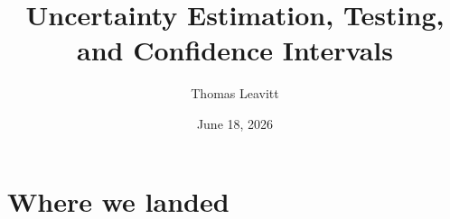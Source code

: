 \documentclass[table, xcolor = {dvipsnames}, 9pt]{beamer}
\title[]{Uncertainty Estimation, Testing, and Confidence Intervals} %
\author{Thomas Leavitt} %
\institute[] %
{
\medskip
\textit{} %
}
\date{June 18, 2026} %
\theoremstyle{plain}
\begin{document}
\begin{frame}
\titlepage %
\end{frame}


\section{Where we landed}
\end{document}
